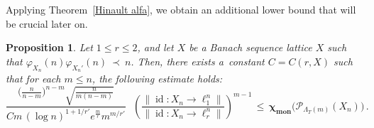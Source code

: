 \documentclass[12pt]{amsart}
\numberwithin{subsection}{section}
\newtheorem{proposition}[theorem]{Proposition}
\theoremstyle{definition}
\theoremstyle{remark}
\DeclareMathOperator{\mon}{mon}
\DeclareMathOperator{\id}{\mathrm{id}}
\newcommand{\chimon}{\chi_{\mon}}
\begin{document}
Applying Theorem~\ref{Hinault alfa}, we obtain an additional lower bound that will be crucial later on.



\begin{proposition} \label{innichen}
Let $1 \leq r \leq 2$, and let $X$ be a Banach sequence lattice $X$  such that $\varphi_{X_n}(n) \varphi_{X_{n}'}(n)~\prec~n$.
Then, there exists a~constant $C = C(r,X)$ such that for each $m\le n$, the following estimate holds{\rm:}
\[
\frac{\Big( \frac{n}{n-m} \Big)^{n-m} \sqrt{\frac{n}{m(n-m)}}}{C m\, (\log n)^{1+1/r'} e^{\frac{m}{r}} m^{m/r'}}
\,\,\,\,\left(  \frac{\|\id \colon X_n\to \ell_1^n\|}{\|\id \colon X_n\to \ell_r^n\|}\right)^{m-1}
\,\leq\,
\boldsymbol{\chimon}\big(\mathcal{P}_{\Lambda_T(m)}(X_n)\big)\,.
\]
\end{proposition}
\end{document}
